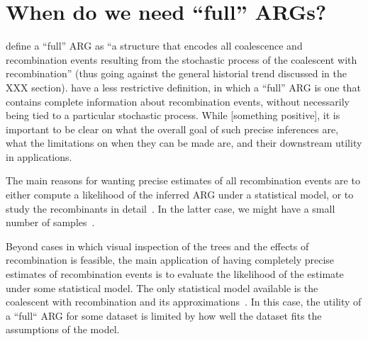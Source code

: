 \documentclass{article}
\begin{document}
\section*{When do we need ``full'' ARGs?}
\citet{brandt2021evaluation} define a ``full'' ARG as
``a structure that encodes all
coalescence and recombination events resulting from the stochastic process of
the coalescent with recombination'' (thus going against the general
historial trend discussed in the XXX section).
\citet{rasmussen2022espalier} have a less restrictive definition, in
which a ``full'' ARG is one that contains complete information about
recombination events, without necessarily being tied to a particular
stochastic process.
While [something positive], it is important to be clear on
what the overall goal of such precise inferences are,
what the limitations on when they can be made are,
and their downstream utility in applications.

The main reasons for wanting precise estimates of all recombination
events are to either compute a likelihood of the inferred ARG
under a statistical model, or to study the recombinants in
detail~\citep{rasmussen2022espalier}.
In the latter case, we might
have a small number of samples~\citep{guo2022recombination}.

Beyond cases in which visual inspection of the trees and the
effects of recombination is feasible, the main application
of having completely precise estimates of recombination events is
to evaluate the likelihood of the estimate under some
statistical model. The only statistical model available
is the coalescent with recombination
and its approximations~\citep{mcvean2005approximating,marjoram2006fast}.
In this case, the utility of a ``full`` ARG for some dataset
is limited by how well the dataset fits the assumptions
of the model.
\end{document}
